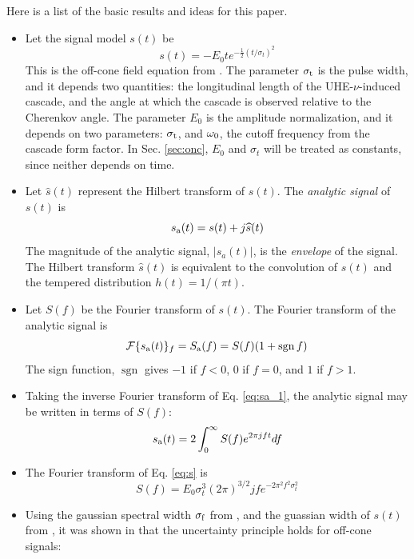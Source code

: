 \documentclass[amsmath,amssymb,aps,prd,10pt,twocolumn,showkeys]{revtex4}
\DeclareMathOperator{\sgn}{sgn}
\begin{document}
Here is a list of the basic results and ideas for this paper.

\begin{itemize}
\item Let the signal model $s(t)$ be
\begin{equation}
s(t) = -E_0 t e^{-\frac{1}{2}\left(t/\sigma_t\right)^2} \label{eq:s}
\end{equation}
This is the off-cone field equation from \cite{PhysRevD.105.123019}.  The parameter $\sigma_{\rm t}$ is the pulse width, and it depends two quantities: the longitudinal length of the UHE-$\nu$-induced cascade, and the angle at which the cascade is observed relative to the Cherenkov angle.  The parameter $E_0$ is the amplitude normalization, and it depends on two parameters: $\sigma_{\rm t}$, and $\omega_{\rm 0}$, the cutoff frequency from the cascade form factor.  In Sec. \ref{sec:onc}, $E_0$ and $\sigma_t$ will be treated as constants, since neither depends on time.
\item Let $\widehat{s}(t)$ represent the Hilbert transform of $s(t)$.  The \textit{analytic signal} of $s(t)$ is
\begin{equation}
s_{\rm a}(t) = s(t) + j \widehat{s}(t)
\end{equation}
The magnitude of the analytic signal, $|s_a(t)|$, is the \textit{envelope} of the signal.  The Hilbert transform $\widehat{s}(t)$ is equivalent to the convolution of $s(t)$ and the tempered distribution $h(t) = 1/(\pi t)$.
\item Let $S(f)$ be the Fourier transform of $s(t)$.  The Fourier transform of the analytic signal is
\begin{equation}
\mathcal{F}\lbrace s_{\rm a}(t) \rbrace_{f} = S_{\rm a}(f) = S(f)(1+\sgn{f}) \label{eq:sa_1}
\end{equation}
The sign function, $\sgn$ gives $-1$ if $f<0$, $0$ if $f=0$, and $1$ if $f>1$.
\item Taking the inverse Fourier transform of Eq. \ref{eq:sa_1}, the analytic signal may be written in terms of $S(f)$:
\begin{equation}
s_{\rm a}(t) = 2\int_{0}^{\infty} S(f) e^{2\pi j f t} df \label{eq:sa_2}
\end{equation}
\item The Fourier transform of Eq. \ref{eq:s} is
\begin{equation}
S(f) = E_0 \sigma_t^3 (2\pi)^{3/2} j f e^{-2\pi^2 f^2 \sigma_t^2}
\end{equation}
\item Using the gaussian spectral width $\sigma_{\rm f}$ from \cite{10.1016/j.astropartphys.2017.03.008}, and the guassian width of $s(t)$ from \cite{PhysRevD.105.123019}, it was shown in \cite{PhysRevD.105.123019} that the uncertainty principle holds for off-cone signals:

\end{itemize}
\end{document}
